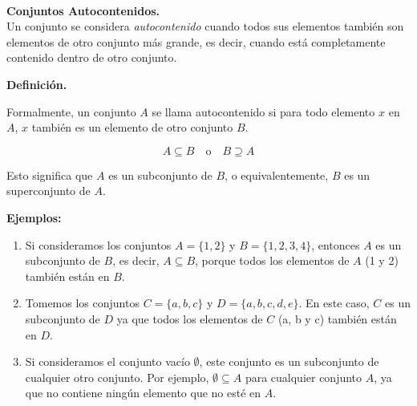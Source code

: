 \\ 

\vspace{10px}\noindent \textbf{Conjuntos Autocontenidos.} \\ Un conjunto se considera \textit{autocontenido} cuando todos sus elementos también son elementos de otro conjunto más grande, es decir, cuando está completamente contenido dentro de otro conjunto.

\noindent \textbf{Definición.}

\noindent Formalmente, un conjunto $A$ se llama autocontenido si para todo elemento $x$ en $A$, $x$ también es un elemento de otro conjunto $B$.

\[
A \subseteq B \quad \text{o} \quad B \supseteq A
\]

\noindent Esto significa que $A$ es un subconjunto de $B$, o equivalentemente, $B$ es un superconjunto de $A$.

\noindent \textbf{Ejemplos:}

\begin{enumerate}
  \item Si consideramos los conjuntos $A = \{1, 2\}$ y $B = \{1, 2, 3, 4\}$, entonces $A$ es un subconjunto de $B$, es decir, $A \subseteq B$, porque todos los elementos de $A$ (1 y 2) también están en $B$.
  
  \item Tomemos los conjuntos $C = \{a, b, c\}$ y $D = \{a, b, c, d, e\}$. En este caso, $C$ es un subconjunto de $D$ ya que todos los elementos de $C$ (a, b y c) también están en $D$.
  
  \item Si consideramos el conjunto vacío $\emptyset$, este conjunto es un subconjunto de cualquier otro conjunto. Por ejemplo, $\emptyset \subseteq A$ para cualquier conjunto $A$, ya que no contiene ningún elemento que no esté en $A$.
\end{enumerate}